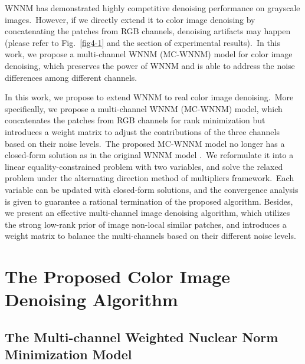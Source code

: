 WNNM has demonstrated highly competitive denoising performance on grayscale images.\ However, if we directly extend it to color image denoising by concatenating the patches from RGB channels, denoising artifacts may happen (please refer to Fig.\ \ref{fig4-1} and the section of experimental results).\ In this work, we propose a multi-channel WNNM (MC-WNNM) model for color image denoising, which preserves the power of WNNM and is able to address the noise differences among different channels.

In this work, we propose to extend WNNM to real color image denoising.\ More specifically, we propose a multi-channel WNNM (MC-WNNM) model, which concatenates the patches from RGB channels for rank minimization but introduces a weight matrix to adjust the contributions of the three channels based on their noise levels.\ The proposed MC-WNNM model no longer has a closed-form solution as in the original WNNM model \cite{wnnmijcv}.\ We reformulate it into a linear equality-constrained problem with two variables, and solve the relaxed problem under the alternating direction method of multipliers \cite{admm} framework.\ Each variable can be updated with closed-form solutions, and the convergence analysis is given to guarantee a rational termination of the proposed algorithm. Besides, we present an effective multi-channel image denoising algorithm, which utilizes the strong low-rank prior of image non-local similar patches, and introduces a weight matrix to balance the multi-channels based on their different noise levels.


\section{The Proposed Color Image Denoising Algorithm}

\subsection{The Multi-channel Weighted Nuclear Norm Minimization Model}

